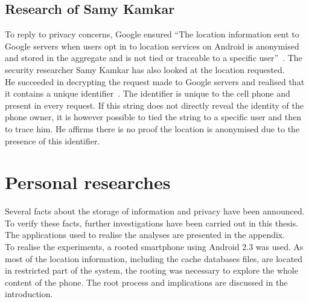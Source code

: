 \subsection{Research of Samy Kamkar}
\label{sec:andro-samy}

To reply to privacy concerns, Google ensured ``The location information sent to Google servers when users opt in to location services on Android is anonymised and stored in the aggregate and is not tied or traceable to a specific user''~\cite{loc-not-traceable}.
The security researcher Samy Kamkar has also looked at the location requested.\\


He succeeded in decrypting the request made to Google servers and realised that it contains a unique identifier~\cite{cnet-andr-samy}.
The identifier is unique to the cell phone and present in every request.
If this string does not directly reveal the identity of the phone owner, it is however possible to tied the string to a specific user and then to trace him.
He affirms there is no proof the location is anonymised due to the presence of this identifier.\\

\section{Personal researches}
\label{sec:andro-perso-research}

Several facts about the storage of information and privacy have been announced.
To verify these facts, further investigations have been carried out in this thesis.
The applications used to realise the analyses are presented in the appendix.\\

To realise the experiments, a rooted smartphone using Android 2.3 was used.
As most of the location information, including the cache databases files, are located in restricted part of the system, the rooting was necessary to explore the whole content of the phone.
The root process and implications are discussed in the introduction.

